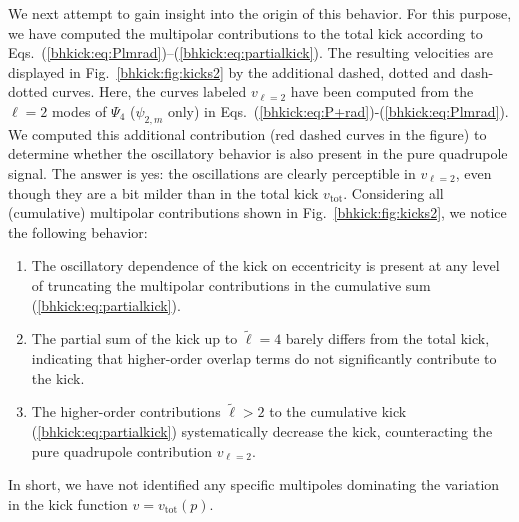 We next attempt to gain insight into the origin of this
behavior. For this purpose, we have computed the
multipolar contributions to the total kick according to
Eqs.~(\ref{bhkick:eq:Plmrad})--(\ref{bhkick:eq:partialkick}). The resulting
velocities are displayed in Fig.~\ref{bhkick:fig:kicks2} by the additional
dashed, dotted and dash-dotted curves.
Here, the curves labeled
$v_{\ell=2}$ have been computed from the $\ell=2$ modes of $\Psi_4$
($\psi_{2,m}$ only) in Eqs.~(\ref{bhkick:eq:P+rad})-(\ref{bhkick:eq:Plmrad}).
We computed this additional contribution (red dashed curves in the
figure) to determine whether the oscillatory behavior is also present
in the pure quadrupole signal. The answer is yes: the oscillations are
clearly perceptible in $v_{\ell=2}$, even though they are a bit milder
than in the total kick $v_{\mathrm{tot}}$. Considering all
(cumulative) multipolar contributions shown in Fig.~\ref{bhkick:fig:kicks2},
we notice the following behavior:
%
\begin{enumerate}
 \item The oscillatory dependence of the kick on eccentricity
       is present at any level of truncating the multipolar
       contributions in the cumulative sum (\ref{bhkick:eq:partialkick}).
 \item The partial sum of the kick up to $\tilde{\ell}=4$
       barely differs from the total kick, indicating that
       higher-order overlap terms do not significantly
       contribute to the kick.
 \item The higher-order contributions $\tilde{\ell}>2$
       to the cumulative kick (\ref{bhkick:eq:partialkick})
       systematically decrease the kick, counteracting
       the pure quadrupole contribution $v_{\ell=2}$.
\end{enumerate}
%
In short, we have not identified any specific multipoles
dominating the variation in the kick function $v=v_{\mathrm{tot}}(p)$.

